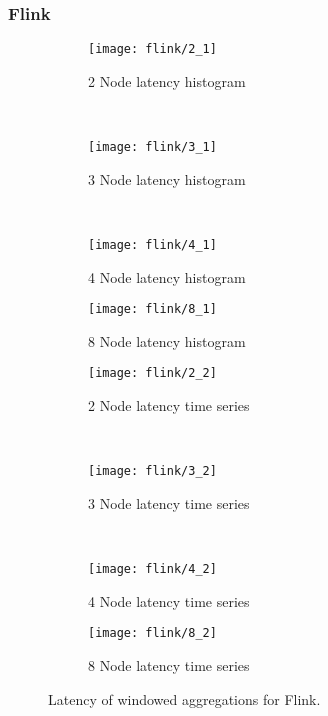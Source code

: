 \subsubsection{Flink}





\begin{figure*}
    \centering
    \begin{subfigure}[b]{0.49\textwidth}
        \texttt{[image: flink/2\_1]}
        \caption{2 Node latency histogram}
    \end{subfigure}
    ~ %
    \begin{subfigure}[b]{0.49\textwidth}
        \texttt{[image: flink/3\_1]}
        \caption{3 Node latency histogram}
    \end{subfigure}
    ~ %
    \begin{subfigure}[b]{0.49\textwidth}
        \texttt{[image: flink/4\_1]}
        \caption{4 Node latency histogram}
    \end{subfigure}
        \begin{subfigure}[b]{0.49\textwidth}
        \texttt{[image: flink/8\_1]}
        \caption{8 Node latency histogram}
    \end{subfigure}


    \begin{subfigure}[b]{0.49\textwidth}
        \texttt{[image: flink/2\_2]}
        \caption{2 Node latency time series}
    \end{subfigure}
    ~ %
    \begin{subfigure}[b]{0.49\textwidth}
        \texttt{[image: flink/3\_2]}
        \caption{3 Node latency time series}
    \end{subfigure}
    ~ %
    \begin{subfigure}[b]{0.49\textwidth}
        \texttt{[image: flink/4\_2]}
        \caption{4 Node latency time series}
    \end{subfigure}
        \begin{subfigure}[b]{0.49\textwidth}
        \texttt{[image: flink/8\_2]}
        \caption{8 Node latency time series}
    \end{subfigure}

    \label{fig_flink_agg_1}
        \caption{Latency of windowed aggregations for Flink.}
\end{figure*}



